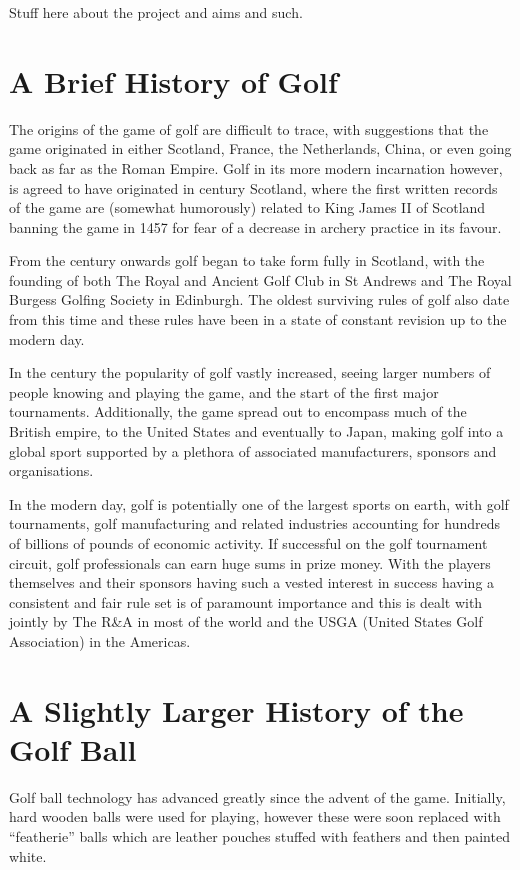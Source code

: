 Stuff here about the project and aims and such.

\section{A Brief History of Golf}

The origins of the game of golf are difficult to trace, with suggestions that the game originated
in either Scotland, France, the Netherlands, China, or even going back as far as the Roman Empire.
Golf in its more modern incarnation however, is agreed to have originated in  century
Scotland, where the first written records of the game are (somewhat humorously) related to
King James II of Scotland banning the game in 1457 for fear of a decrease in archery practice
in its favour.

From the  century onwards golf began to take form fully in Scotland, with the founding
of both The Royal and Ancient Golf Club in St Andrews and The Royal Burgess Golfing Society
in Edinburgh. The oldest surviving rules of golf also date from this time and these rules have been
in a state of constant revision up to the modern day.

In the  century the popularity of golf vastly increased, seeing larger numbers of people
knowing and playing the game, and the start of the first major tournaments. Additionally, the
game spread out to encompass much of the British empire, to the United States and eventually to
Japan, making golf into a global sport supported by a plethora of associated manufacturers, sponsors
and organisations.

In the modern day, golf is potentially one of the largest sports on earth, with golf tournaments,
golf manufacturing and related industries accounting for hundreds of billions of pounds of
economic activity. If successful on the golf tournament circuit, golf professionals can earn huge sums
in prize money. With the players themselves and their sponsors having such a vested interest in success
having a consistent and fair rule set is of paramount importance and this is dealt with jointly by 
The R\&A in most of the world and the USGA (United States Golf Association) 
in the Americas.

\section{A Slightly Larger History of the Golf Ball}

Golf ball technology has advanced greatly since the advent of the game. Initially, hard wooden
balls were used for playing, however these were soon replaced with “featherie” balls which are
leather pouches stuffed with feathers and then painted white.


